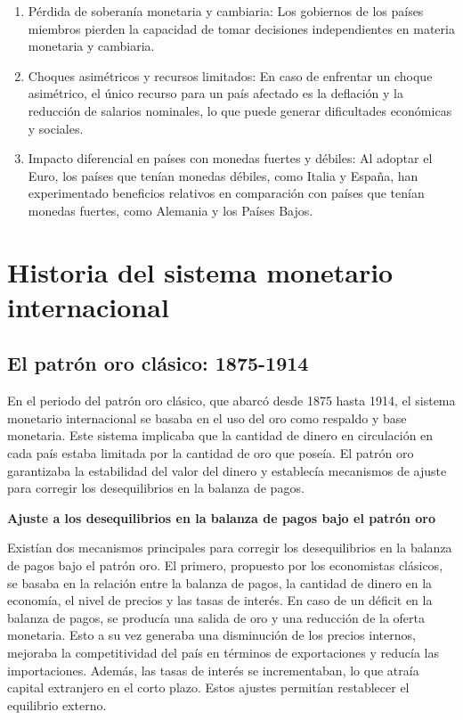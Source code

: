 \documentclass[
  jou,
  floatsintext,
  longtable,
  a4paper,
  nolmodern,
  notxfonts,
  notimes,
  12pt,
  colorlinks=true,linkcolor=blue,citecolor=blue,urlcolor=blue]{apa7}
\begin{document}
\begin{enumerate}
\def\labelenumi{\arabic{enumi}.}
\item
  Pérdida de soberanía monetaria y cambiaria: Los gobiernos de los
  países miembros pierden la capacidad de tomar decisiones
  independientes en materia monetaria y cambiaria.
\item
  Choques asimétricos y recursos limitados: En caso de enfrentar un
  choque asimétrico, el único recurso para un país afectado es la
  deflación y la reducción de salarios nominales, lo que puede generar
  dificultades económicas y sociales.
\item
  Impacto diferencial en países con monedas fuertes y débiles: Al
  adoptar el Euro, los países que tenían monedas débiles, como Italia y
  España, han experimentado beneficios relativos en comparación con
  países que tenían monedas fuertes, como Alemania y los Países Bajos.
\end{enumerate}

\section{Historia del sistema monetario
internacional}\label{historia-del-sistema-monetario-internacional}

\subsection{El patrón oro clásico:
1875-1914}\label{el-patruxf3n-oro-cluxe1sico-1875-1914}

En el periodo del patrón oro clásico, que abarcó desde 1875 hasta 1914,
el sistema monetario internacional se basaba en el uso del oro como
respaldo y base monetaria. Este sistema implicaba que la cantidad de
dinero en circulación en cada país estaba limitada por la cantidad de
oro que poseía. El patrón oro garantizaba la estabilidad del valor del
dinero y establecía mecanismos de ajuste para corregir los
desequilibrios en la balanza de pagos.

\textbf{Ajuste a los desequilibrios en la balanza de pagos bajo el
patrón oro}

Existían dos mecanismos principales para corregir los desequilibrios en
la balanza de pagos bajo el patrón oro. El primero, propuesto por los
economistas clásicos, se basaba en la relación entre la balanza de
pagos, la cantidad de dinero en la economía, el nivel de precios y las
tasas de interés. En caso de un déficit en la balanza de pagos, se
producía una salida de oro y una reducción de la oferta monetaria. Esto
a su vez generaba una disminución de los precios internos, mejoraba la
competitividad del país en términos de exportaciones y reducía las
importaciones. Además, las tasas de interés se incrementaban, lo que
atraía capital extranjero en el corto plazo. Estos ajustes permitían
restablecer el equilibrio externo.
\end{document}
